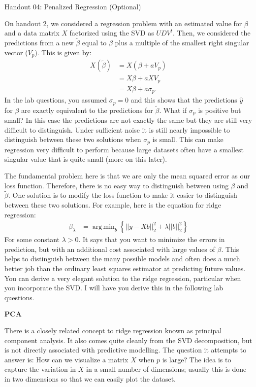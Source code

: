 \documentclass[12pt,hidelinks]{article}
\DeclareMathOperator*{\argmin}{arg\,min}
\numberwithin{equation}{section}
\begin{document}
{\LARGE Handout 04: Penalized Regression (Optional)}

\vspace*{18pt}

On handout 2, we considered a regression problem with an estimated
value for $\beta$ and a data matrix $X$ factorized using the SVD as $UDV^{t}$.
Then, we considered the predictions from a new $\tilde{\beta}$ equal to $\beta$
plus a multiple of the smallest right singular vector ($V_p$). This is given
by:
\begin{align}
X(\tilde{\beta}) &= X(\beta + a V_p) \\
&= X\beta + a X V_p \\
&= X\beta + a \sigma_p.
\end{align}
In the lab questions, you assumed $\sigma_p=0$ and this shows that the predictions
$\widehat{y}$ for $\beta$ are exactly equivalent to the predictions for $\tilde{\beta}$.
What if $\sigma_p$ is positive but small? In this case the predictions are not
exactly the same but they are still very difficult to distinguish. Under sufficient
noise it is still nearly impossible to distinguish between these two solutions when
$\sigma_p$ is small. This can make regression very difficult to perform because
large datasets often have a smallest singular value that is quite small (more on
this later).

The fundamental problem here is that we are only the mean squared error as our
loss function. Therefore, there is no easy way to distinguish between using
$\beta$ and $\tilde{\beta}$. One solution is to modify the loss function to make
it easier to distinguish between these two solutions. For example, here is the
equation for ridge regression:
\begin{align}
\beta_{\lambda} &= \argmin_b \left\{ || y - Xb||_2^2 + \lambda ||b||_2^2 \right\}
\end{align}
For some constant $\lambda > 0$. It says that you want to minimize the errors
in prediction, but with an additional cost associated with large values of $\beta$.
This helps to distinguish between the many possible models and often does a much
better job than the ordinary least squares estimator at predicting future values.
You can derive a very elegant solution to the ridge regression, particular when
you incorporate the SVD. I will have you derive this in the following lab questions.

\textbf{PCA}

There is a closely related concept to ridge regression known as principal component
analysis. It also comes quite cleanly from the SVD decomposition, but is not
directly associated with predictive modelling. The question it attempts to answer
is: How can we visualize a matrix $X$ when $p$ is large? The idea is to capture
the variation in $X$ in a small number of dimensions; usually this is done in two
dimensions so that we can easily plot the dataset.
\end{document}
